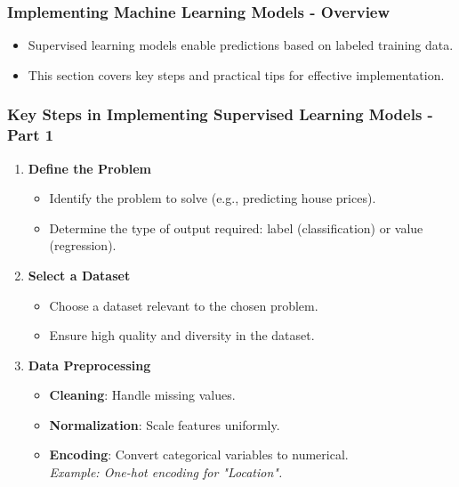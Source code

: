 \documentclass[aspectratio=169]{beamer}
\begin{document}
\begin{frame}[fragile]
    \frametitle{Implementing Machine Learning Models - Overview}
    \begin{itemize}
        \item Supervised learning models enable predictions based on labeled training data.
        \item This section covers key steps and practical tips for effective implementation.
    \end{itemize}
\end{frame}

\begin{frame}[fragile]
    \frametitle{Key Steps in Implementing Supervised Learning Models - Part 1}
    \begin{enumerate}
        \item \textbf{Define the Problem}
            \begin{itemize}
                \item Identify the problem to solve (e.g., predicting house prices).
                \item Determine the type of output required: label (classification) or value (regression).
            \end{itemize}
        
        \item \textbf{Select a Dataset}
            \begin{itemize}
                \item Choose a dataset relevant to the chosen problem.
                \item Ensure high quality and diversity in the dataset.
            \end{itemize}
        
        \item \textbf{Data Preprocessing}
            \begin{itemize}
                \item \textbf{Cleaning}: Handle missing values.
                \item \textbf{Normalization}: Scale features uniformly.
                \item \textbf{Encoding}: Convert categorical variables to numerical.\\ 
                \textit{Example: One-hot encoding for "Location".}
            \end{itemize}
    \end{enumerate}
\end{frame}
\end{document}
